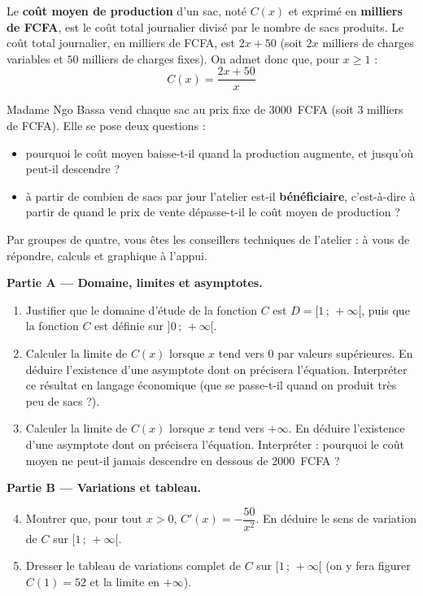 \documentclass[11pt]{article}
\newcounter{popsec}
\newcounter{popsub}
\newcommand{\courssub}[1]{%
  \stepcounter{popsub}%
  \par\vspace{9pt}\noindent{\popxbold\fontsize{11.5}{13}\selectfont\color{popink}{\color{poporange}\thepopsec.\thepopsub}\hspace{6pt}#1}\par\nopagebreak\vspace{4pt}
}
\begin{document}
Le \textbf{coût moyen de production} d'un sac, noté $C(x)$ et exprimé en \textbf{milliers de FCFA}, est le coût total journalier divisé par le nombre de sacs produits. Le coût total journalier, en milliers de FCFA, est $2x + 50$ (soit $2x$ milliers de charges variables et $50$ milliers de charges fixes). On admet donc que, pour $x \geq 1$ :
\[ C(x) = \frac{2x + 50}{x} \]

Madame Ngo Bassa vend chaque sac au prix fixe de \SI{3000}{FCFA} (soit 3 milliers de FCFA). Elle se pose deux questions :
\begin{itemize}
\item pourquoi le coût moyen baisse-t-il quand la production augmente, et jusqu'où peut-il descendre ?
\item à partir de combien de sacs par jour l'atelier est-il \textbf{bénéficiaire}, c'est-à-dire à partir de quand le prix de vente dépasse-t-il le coût moyen de production ?
\end{itemize}

Par groupes de quatre, vous êtes les conseillers techniques de l'atelier : à vous de répondre, calculs et graphique à l'appui.

\courssub{Consignes}

\textbf{Partie A — Domaine, limites et asymptotes.}
\begin{enumerate}
\item Justifier que le domaine d'étude de la fonction $C$ est $D = [1\,;\,+\infty[$, puis que la fonction $C$ est définie sur $]0\,;\,+\infty[$.
\item Calculer la limite de $C(x)$ lorsque $x$ tend vers $0$ par valeurs supérieures. En déduire l'existence d'une asymptote dont on précisera l'équation. Interpréter ce résultat en langage économique (que se passe-t-il quand on produit très peu de sacs ?).
\item Calculer la limite de $C(x)$ lorsque $x$ tend vers $+\infty$. En déduire l'existence d'une asymptote dont on précisera l'équation. Interpréter : pourquoi le coût moyen ne peut-il jamais descendre en dessous de \SI{2000}{FCFA} ?
\end{enumerate}

\textbf{Partie B — Variations et tableau.}
\begin{enumerate}
\setcounter{enumi}{3}
\item Montrer que, pour tout $x > 0$, $C'(x) = -\dfrac{50}{x^{2}}$. En déduire le sens de variation de $C$ sur $[1\,;\,+\infty[$.
\item Dresser le tableau de variations complet de $C$ sur $[1\,;\,+\infty[$ (on y fera figurer $C(1) = 52$ et la limite en $+\infty$).
\end{enumerate}
\end{document}
